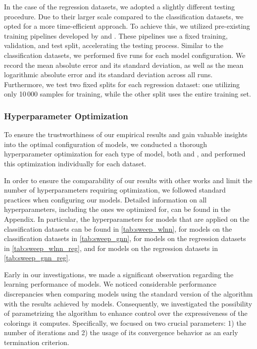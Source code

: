 In the case of the regression datasets, we adopted a slightly different testing procedure. Due to their larger scale compared to the classification datasets, we opted for a more time-efficient approach. To achieve this, we utilized pre-existing training pipelines developed by \cite{Mor+2020} and \cite{Morris2022}. These pipelines use a fixed training, validation, and test split, accelerating the testing process. Similar to the classification datasets, we performed five runs for each model configuration. We record the mean absolute error and its standard deviation, as well as the mean logarithmic absolute error and its standard deviation across all runs. Furthermore, we test two fixed splits for each regression dataset: one utilizing only 10\,000 samples for training, while the other split uses the entire training set. 

\subsubsection{Hyperparameter Optimization}\label{sec:hyperparam}
To ensure the trustworthiness of our empirical results and gain valuable insights into the optimal configuration of \wlnn models, we conducted a thorough hyperparameter optimization for each type of model, both \gnn and \wlnn, and performed this optimization individually for each dataset.

In order to ensure the comparability of our results with other works and limit the number of hyperparameters requiring optimization, we followed standard practices when configuring our models. Detailed information on all hyperparameters, including the ones we optimized for, can be found in the Appendix. In particular, the hyperparameters for \wlnn models that are applied on the classification datasets can be found in \cref{tab:sweep_wlnn}, for \gnn models on the classification datasets in \cref{tab:sweep_gnn}, for \wlnn models on the regression datasets in \cref{tab:sweep_wlnn_reg}, and for \gnn models on the regression datasets in \cref{tab:sweep_gnn_reg}. 

Early in our investigations, we made a significant observation regarding the learning performance of \wlnn models. We noticed considerable performance discrepancies when comparing \wlnn models using the standard version of the \wl algorithm with the results achieved by \gnn models. Consequently, we investigated the possibility of parametrizing the \wl algorithm to enhance control over the expressiveness of the colorings it computes. Specifically, we focused on two crucial parameters: 1) the number of iterations and 2) the usage of its convergence behavior as an early termination criterion.

